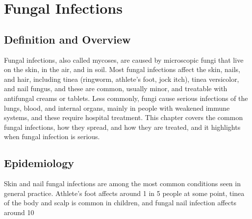 \chapter{Fungal Infections}

\section*{Definition and Overview}
Fungal infections, also called mycoses, are caused by microscopic fungi that live on the skin, in the air, and in soil. Most fungal infections affect the skin, nails, and hair, including tinea (ringworm, athlete's foot, jock itch), tinea versicolor, and nail fungus, and these are common, usually minor, and treatable with antifungal creams or tablets. Less commonly, fungi cause serious infections of the lungs, blood, and internal organs, mainly in people with weakened immune systems, and these require hospital treatment. This chapter covers the common fungal infections, how they spread, and how they are treated, and it highlights when fungal infection is serious.

\section*{Epidemiology}
Skin and nail fungal infections are among the most common conditions seen in general practice. Athlete's foot affects around 1 in 5 people at some point, tinea of the body and scalp is common in children, and fungal nail infection affects around 10%


